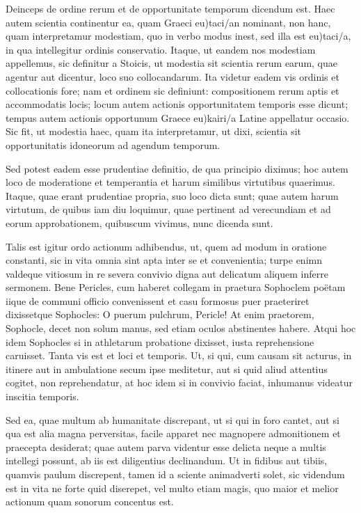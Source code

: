  Deinceps de ordine rerum et de opportunitate temporum dicendum est. Haec autem scientia continentur ea, quam Graeci eu)taci/an nominant, non hanc, quam interpretamur modestiam, quo in verbo modus inest, sed illa est eu)taci/a, in qua intellegitur ordinis conservatio. Itaque, ut eandem nos modestiam appellemus, sic definitur a Stoicis, ut modestia sit scientia rerum earum, quae agentur aut dicentur, loco suo collocandarum. Ita videtur eadem vis ordinis et collocationis fore; nam et ordinem sic definiunt: compositionem rerum aptis et accommodatis locis; locum autem actionis opportunitatem temporis esse dicunt; tempus autem actionis opportunum Graece eu)kairi/a Latine appellatur occasio. Sic fit, ut modestia haec, quam ita interpretamur, ut dixi, scientia sit opportunitatis idoneorum ad agendum temporum.

 Sed potest eadem esse prudentiae definitio, de qua principio diximus; hoc autem loco de moderatione et temperantia et harum similibus virtutibus quaerimus. Itaque, quae erant prudentiae propria, suo loco dicta sunt; quae autem harum virtutum, de quibus iam diu loquimur, quae pertinent ad verecundiam et ad eorum approbationem, quibuscum vivimus, nunc dicenda sunt.

 Talis est igitur ordo actionum adhibendus, ut, quem ad modum in oratione constanti, sic in vita omnia sint apta inter se et convenientia; turpe enimn valdeque vitiosum in re severa convivio digna aut delicatum aliquem inferre sermonem. Bene Pericles, cum haberet collegam in praetura Sophoclem poëtam iique de communi officio convenissent et casu formosus puer praeteriret dixissetque Sophocles: O puerum pulchrum, Pericle! At enim praetorem, Sophocle, decet non solum manus, sed etiam oculos abstinentes habere. Atqui hoc idem Sophocles si in athletarum probatione dixisset, iusta reprehensione caruisset. Tanta vis est et loci et temporis. Ut, si qui, cum causam sit acturus, in itinere aut in ambulatione secum ipse meditetur, aut si quid aliud attentius cogitet, non reprehendatur, at hoc idem si in convivio faciat, inhumanus videatur inscitia temporis.

 Sed ea, quae multum ab humanitate discrepant, ut si qui in foro cantet, aut si qua est alia magna perversitas, facile apparet nec magnopere admonitionem et praecepta desiderat; quae autem parva videntur esse delicta neque a multis intellegi possunt, ab iis est diligentius declinandum. Ut in fidibus aut tibiis, quamvis paulum discrepent, tamen id a sciente animadverti solet, sic videndum est in vita ne forte quid diserepet, vel multo etiam magis, quo maior et melior actionum quam sonorum concentus est.

